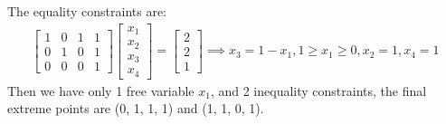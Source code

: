 \documentclass[12pt]{article}
\begin{document}
\begin{enumerate}[label= (\alph*), leftmargin=2em]
The equality constraints are:
\begin{align*}
\begin{bmatrix}
1 & 0 & 1 & 1 \\
0 & 1 & 0 & 1 \\
0 & 0 & 0 & 1
\end{bmatrix}
\begin{bmatrix}
x_1 \\ x_2 \\ x_3 \\ x_4
\end{bmatrix}
=
\begin{bmatrix}
2 \\ 2 \\ 1
\end{bmatrix} \implies x_3 = 1 - x_1, 1 \geq x_1 \geq 0, x_2 = 1, x_4 = 1
\end{align*}
Then we have only 1 free variable $x_1$, and 2 inequality constraints, the final extreme points are (0, 1, 1, 1) and (1, 1, 0, 1).
\end{enumerate}
\end{document}
